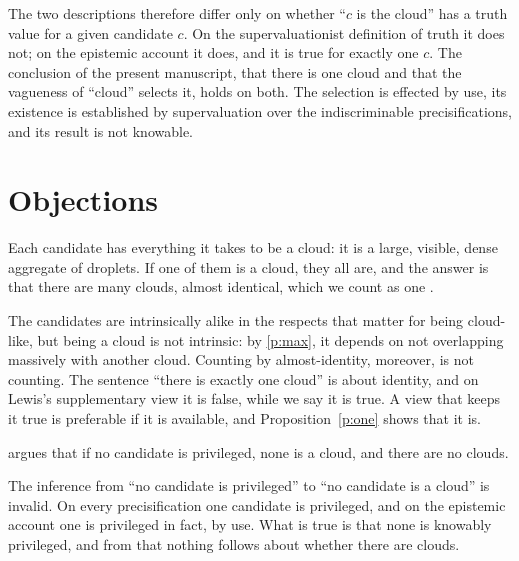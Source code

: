 \documentclass{situationist-preprint}
\begin{document}
The two descriptions therefore differ only on whether \enquote{$c$ is the cloud} has a truth value for a given candidate $c$. On the supervaluationist definition of truth it does not; on the epistemic account it does, and it is true for exactly one $c$. The conclusion of the present manuscript, that there is one cloud and that the vagueness of \enquote{cloud} selects it, holds on both. The selection is effected by use, its existence is established by supervaluation over the indiscriminable precisifications, and its result is not knowable.

\section{Objections}

\begin{objection}
Each candidate has everything it takes to be a cloud: it is a large, visible, dense aggregate of droplets. If one of them is a cloud, they all are, and the answer is that there are many clouds, almost identical, which we count as one \citep{Lewis1993}.
\end{objection}

\begin{reply}
The candidates are intrinsically alike in the respects that matter for being cloud-like, but being a cloud is not intrinsic: by \ref{p:max}, it depends on not overlapping massively with another cloud. Counting by almost-identity, moreover, is not counting. The sentence \enquote{there is exactly one cloud} is about identity, and on Lewis's supplementary view it is false, while we say it is true. A view that keeps it true is preferable if it is available, and Proposition~\ref{p:one} shows that it is.
\end{reply}

\begin{objection}[Nihilism]
\citet{Unger1980} argues that if no candidate is privileged, none is a cloud, and there are no clouds.
\end{objection}

\begin{reply}
The inference from \enquote{no candidate is privileged} to \enquote{no candidate is a cloud} is invalid. On every precisification one candidate is privileged, and on the epistemic account one is privileged in fact, by use. What is true is that none is knowably privileged, and from that nothing follows about whether there are clouds.
\end{reply}
\end{document}
